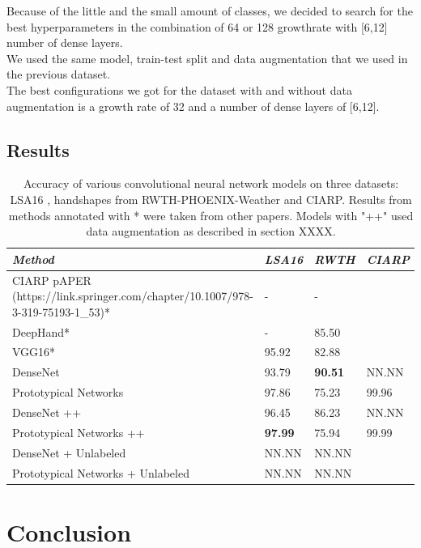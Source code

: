 \documentclass[runningheads,a4paper]{llncs}
\begin{document}
Because of the little and the small amount of classes, we decided to search for the best hyperparameters in the combination of 64 or 128 growthrate with [6,12] number of dense layers. \\

We used the same model, train-test split and data augmentation that we used in the previous dataset. \\

The best configurations we got for the dataset with and without data augmentation is a growth rate of 32 and a number of dense layers of [6,12].

\subsection{Results}

\begin{table}[h!]
\centering
\begin{tabular}{ p{18em} p{7em} p{8em} p{8em}}
\toprule
\emph{Method} & \emph{LSA16} &  \emph{RWTH}  &  \emph{CIARP} \\ \midrule
CIARP pAPER (https://link.springer.com/chapter/10.1007/978-3-319-75193-1\_53)* \cite{CIARP_resultados} & - & - &  \\
DeepHand* \cite{koller2016deep} & - & 85.50 \\
VGG16* \cite{Quiroga_blablabla} & 95.92 & 82.88 \\
DenseNet \cite{} & 93.79 & \textbf{90.51} & NN.NN \\
Prototypical Networks \cite{} & 97.86 & 75.23 & 99.96 \\
DenseNet ++ \cite{} & 96.45 & 86.23 & NN.NN \\
Prototypical Networks ++\cite{} & \textbf{97.99} & 75.94 & 99.99  \\
DenseNet + Unlabeled \cite{} & NN.NN & NN.NN \\
Prototypical Networks + Unlabeled \cite{} & NN.NN & NN.NN \\
\bottomrule
\end{tabular}
\caption{Accuracy of various convolutional neural network models on three datasets: LSA16 \cite{ronchetti2016a}, handshapes from RWTH-PHOENIX-Weather \cite{koller2016deep} and CIARP. Results from methods annotated with * were taken from other papers. Models with "++" used data augmentation as described in section XXXX. \label{tab:results}}
\end{table}

\section{Conclusion}
\end{document}

